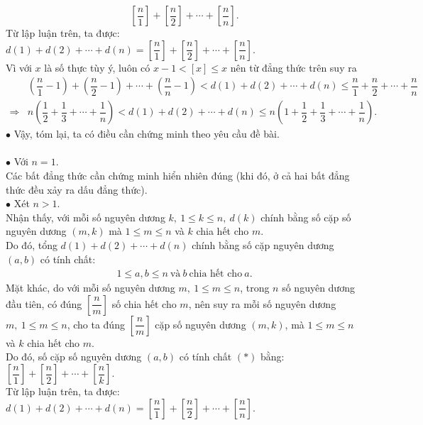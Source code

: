 \begin{bt}
{		$$ \left[\dfrac{n}{1}\right] +\left[\dfrac{n}{2}\right]+\cdots+\left[\dfrac{n}{n}\right].$$
		Từ lập luận trên, ta được: $ d(1)+d(2)+\cdots+d(n)= \left[\dfrac{n}{1}\right] +\left[\dfrac{n}{2}\right]+\cdots+\left[\dfrac{n}{n}\right] $.\\
		Vì với $ x $ là số thực tùy ý, luôn có $ x-1 < \left[x\right] \le x $ nên từ đẳng thức trên suy ra
{\allowdisplaybreaks
\begin{align*}
	&\left(\dfrac{n}{1}-1\right) + \left(\dfrac{n}{2}-1\right) +\cdots+ \left(\dfrac{n}{n}-1\right) < d(1)+d(2)+\cdots+d(n) \le \dfrac{n}{1}+\dfrac{n}{2}+\cdots+\dfrac{n}{n}\\
	\Rightarrow& n \left(\dfrac{1}{2}+\dfrac{1}{3}+\cdots+\dfrac{1}{n}\right)< d(1)+d(2)+\cdots+d(n) \le n \left(1+\dfrac{1}{2}+\dfrac{1}{3}+\cdots+\dfrac{1}{n}\right).
\end{align*}}$ \bullet $	Vậy, tóm lại, ta có điều cần chứng minh theo yêu cầu đề bài.\\
		\\ 
		$ \bullet $ Với $ n=1 $.\\
		Các bất đẳng thức cần chứng minh hiển nhiên đúng (khi đó, ở cả hai bất đẳng thức đều xảy ra dấu đẳng thức).\\
		$ \bullet $ Xét $ n > 1 $.\\
		Nhận thấy, với mỗi số nguyên dương $ k, \ 1 \le k \le n,\ d(k) $ chính bằng số cặp số nguyên dương $ (m,k) $ mà $ 1 \le m \le n $ và $ k $ chia hết cho $ m $.\\
		Do đó, tổng $ d(1)+d(2)+\cdots+d(n) $ chính bằng số cặp nguyên dương $ (a,b) $ có tính chất: 
		\begin{align*}
			1 \le a,b \le n \ \text{và} \ b \ \text{chia hết cho}\ a .\tag{*}
		\end{align*}
		Mặt khác, do với mỗi số nguyên dương $ m, \ 1 \le m \le n $, trong $ n $ số nguyên dương đầu tiên, có đúng $ \left[\dfrac{n}{m}\right] $ số chia hết cho $ m $, nên suy ra mỗi số nguyên dương $ m, \ 1 \le m \le n $, cho ta đúng $ \left[\dfrac{n}{m}\right] $ cặp số nguyên dương $ (m,k) $, mà $ 1 \le m \le n $ và $ k $ chia hết cho $ m $.\\
		Do đó, số cặp số nguyên dương $ (a,b) $ có tính chất $ (*) $ bằng: $ \left[\dfrac{n}{1}\right] +\left[\dfrac{n}{2}\right]+\cdots+\left[\dfrac{n}{k}\right] $.\\
		Từ lập luận trên, ta được: $ d(1)+d(2)+\cdots+d(n)= \left[\dfrac{n}{1}\right] +\left[\dfrac{n}{2}\right]+\cdots+\left[\dfrac{n}{n}\right] $.\\
}
\end{bt}
